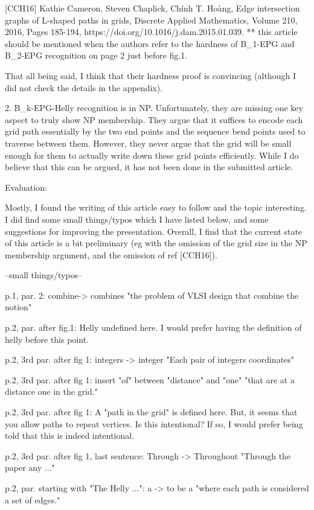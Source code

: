 [CCH16] Kathie Cameron, Steven Chaplick, Chính T. Hoàng,
Edge intersection graphs of L-shaped paths in grids,
Discrete Applied Mathematics, Volume 210, 2016, Pages 185-194,
https://doi.org/10.1016/j.dam.2015.01.039.
** this article should be mentioned when the authors refer to the hardness of B_1-EPG and B_2-EPG recognition on page 2 just before fig.1. 

That all being said, I think that their hardness proof is convincing (although I did not check the details in the appendix). 


2. B_k-EPG-Helly recognition is in NP. Unfortunately, they are missing one key aspect to truly show NP membership. They argue that it suffices to encode each grid path essentially by the two end points and the sequence bend points used to traverse between them. However, they never argue that the grid will be small enough for them to actually write down these grid points efficiently. While I do believe that this can be argued, it has not been done in the submitted article. 

Evaluation:

Mostly, I found the writing of this article easy to follow and the topic interesting. I did find some small things/typos which I have listed below, and some suggestions for improving the presentation. Overall, I find that the current state of this article is a bit preliminary (eg with the omission of the grid size in the NP membership argument, and the omission of ref [CCH16]). 

--small things/typos--

p.1, par. 2: combine-> combines
"the problem of VLSI design that combine the notion" 

p.2, par. after fig.1: Helly undefined here. I would prefer having the definition of helly before this point. 

p.2, 3rd par. after fig 1: integers -> integer
"Each pair of integers coordinates" 

p.2, 3rd par. after fig 1: insert "of" between "distance" and "one"
"that are at a distance one in the grid."

p.2, 3rd par. after fig 1: A "path in the grid" is defined here. But, it seems that you allow paths to repeat vertices. Is this intentional? If so, I would prefer being told that this is indeed intentional. 

p.2, 3rd par. after fig 1, last sentence: Through -> Throughout
"Through the paper any ..."

p.2, par. starting with "The Helly ...": a -> to be a
"where each path is considered a set of edges."

